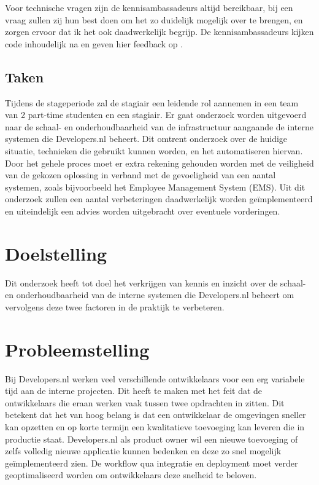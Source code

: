 Voor technische vragen zijn de kennisambassadeurs altijd bereikbaar, bij een vraag zullen zij hun best doen om het zo duidelijk mogelijk over te brengen, en zorgen ervoor dat ik het ook daadwerkelijk begrijp. De kennisambassadeurs kijken code inhoudelijk na en geven hier feedback op \parencite{Stageplan}.

\subsection{Taken}
Tijdens de stageperiode zal de stagiair een leidende rol aannemen in een team van 2 part-time studenten en een stagiair. Er gaat onderzoek worden uitgevoerd naar de schaal- en onderhoudbaarheid van de infrastructuur aangaande de interne systemen die Developers.nl beheert. Dit omtrent onderzoek over de huidige situatie, technieken die gebruikt kunnen worden, en het automatiseren hiervan. Door het gehele proces moet er extra rekening gehouden worden met de veiligheid van de gekozen oplossing in verband met de gevoeligheid van een aantal systemen, zoals bijvoorbeeld het Employee Management System (EMS). Uit dit onderzoek zullen een aantal verbeteringen daadwerkelijk worden geïmplementeerd en uiteindelijk een advies worden uitgebracht over eventuele vorderingen.

\section{Doelstelling}
Dit onderzoek heeft tot doel het verkrijgen van kennis en inzicht over de schaal- en onderhoudbaarheid van de interne systemen die Developers.nl beheert om vervolgens deze twee factoren in de praktijk te verbeteren.

\section{Probleemstelling}
Bij Developers.nl werken veel verschillende ontwikkelaars voor een erg variabele tijd aan de interne projecten. Dit heeft te maken met het feit dat de ontwikkelaars die eraan werken vaak tussen twee opdrachten in zitten. Dit betekent dat het van hoog belang is dat een ontwikkelaar de omgevingen sneller kan opzetten en op korte termijn een kwalitatieve toevoeging kan leveren die in productie staat. Developers.nl als product owner wil een nieuwe toevoeging of zelfs volledig nieuwe applicatie kunnen bedenken en deze zo snel mogelijk geïmplementeerd zien. De workflow qua integratie en deployment moet verder geoptimaliseerd worden om ontwikkelaars deze snelheid te beloven.

